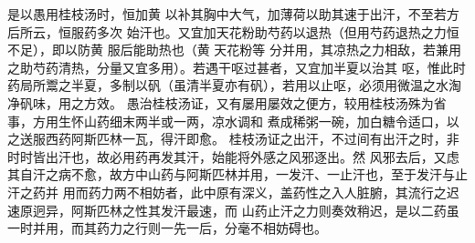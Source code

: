 \documentclass[a4paper,12pt,UTF8,twoside]{ctexbook}
\begin{document}
是以愚用桂枝汤时，恒加黄 以补其胸中大气，加薄荷以助其速于出汗，不至若方后所云，恒服药多次 
始汗也。又宜加天花粉助芍药以退热（但用芍药退热之力恒不足），即以防黄 服后能助热也（黄 天花粉等 
分并用，其凉热之力相敌，若兼用之助芍药清热，分量又宜多用）。若遇干呕过甚者，又宜加半夏以治其 
呕，惟此时药局所鬻之半夏，多制以矾（虽清半夏亦有矾），若用以止呕，必须用微温之水淘净矾味，用之方效。 
愚治桂枝汤证，又有屡用屡效之便方，较用桂枝汤殊为省事，方用生怀山药细末两半或一两，凉水调和 
煮成稀粥一碗，加白糖令适口，以之送服西药阿斯匹林一瓦，得汗即愈。 
桂枝汤证之出汗，不过间有出汗之时，非时时皆出汗也，故必用药再发其汗，始能将外感之风邪逐出。然 
风邪去后，又虑其自汗之病不愈，故方中山药与阿斯匹林并用，一发汗、一止汗也，至于发汗与止汗之药并 
用而药力两不相妨者，此中原有深义，盖药性之入人脏腑，其流行之迟速原迥异，阿斯匹林之性其发汗最速，而 
山药止汗之力则奏效稍迟，是以二药虽一时并用，而其药力之行则一先一后，分毫不相妨碍也。 
\end{document}
